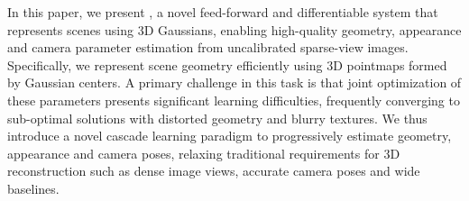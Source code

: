 

In this paper, we present \method, a novel feed-forward and differentiable system that represents scenes using 3D Gaussians, enabling high-quality geometry, appearance and camera parameter estimation from uncalibrated sparse-view images. Specifically, we represent scene geometry efficiently using 3D pointmaps formed by Gaussian centers. A primary challenge in this task is that joint optimization of these parameters presents significant learning difficulties, frequently converging to sub-optimal solutions with distorted geometry and blurry textures. We thus introduce a novel cascade learning paradigm to progressively estimate geometry, appearance and camera poses, relaxing traditional requirements for 3D reconstruction such as dense image views, accurate camera poses and wide baselines.


